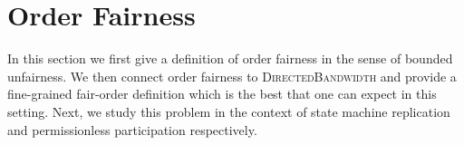 \section{Order Fairness}
\label{sec:order-fairness}

In this section we first give a definition of order fairness in the sense of  bounded unfairness.
%
We then connect order fairness to \textsc{DirectedBandwidth} and provide a fine-grained fair-order definition which is the best that one can expect in this setting.
%
Next, we study this problem in the context of state machine replication and permissionless participation respectively.






